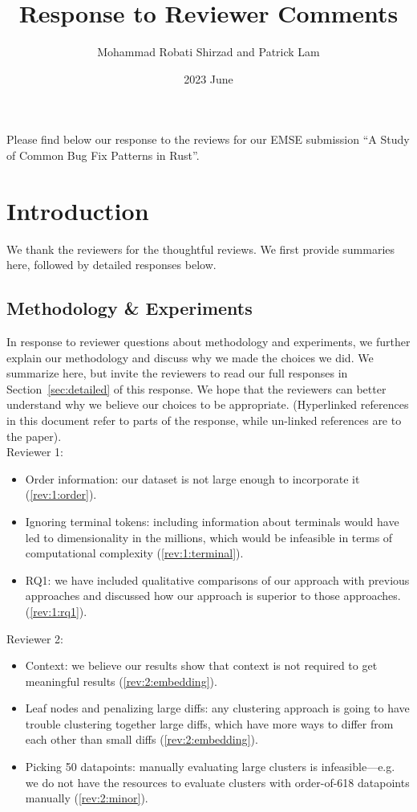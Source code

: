 \documentclass{article}
\title{Response to Reviewer Comments}
\date{2023 June}
\author{Mohammad Robati Shirzad and Patrick Lam}
\begin{document}
\maketitle

Please find below our response to the reviews for our EMSE submission ``A Study of Common Bug Fix Patterns in Rust''.

\section{Introduction}

We thank the reviewers for the thoughtful reviews. We first provide summaries here, followed by detailed responses below.

\subsection{Methodology \& Experiments}

In response to reviewer questions about methodology and experiments, we further explain our methodology and discuss why we made the choices we did. We summarize here, but invite the reviewers to read our full responses in Section~\ref{sec:detailed} of this response. We hope that the reviewers can better understand why we believe our choices to be appropriate. (Hyperlinked references in this document refer to parts of the response, while un-linked references are to the paper).\\ 

Reviewer 1:
\begin{itemize}
    \item Order information: our dataset is not large enough to incorporate it (\ref{rev:1:order}).
    \item Ignoring terminal tokens: including information about terminals would have led to dimensionality in the millions, which would be infeasible in terms of computational complexity (\ref{rev:1:terminal}). 
    \item RQ1: we have included qualitative comparisons of our approach with previous approaches and discussed how our approach is superior to those approaches. (\ref{rev:1:rq1}).
\end{itemize} 

Reviewer 2:
\begin{itemize}
    \item Context: we believe our results show that context is not required to get meaningful results (\ref{rev:2:embedding}).
    \item Leaf nodes and penalizing large diffs: any clustering approach is going to have trouble clustering together large diffs, which have more ways to differ from each other than small diffs (\ref{rev:2:embedding}). 
    \item Picking 50 datapoints: manually evaluating large clusters is infeasible---e.g. we do not have the resources to evaluate clusters with order-of-618 datapoints manually (\ref{rev:2:minor}).
\end{itemize}
\end{document}
